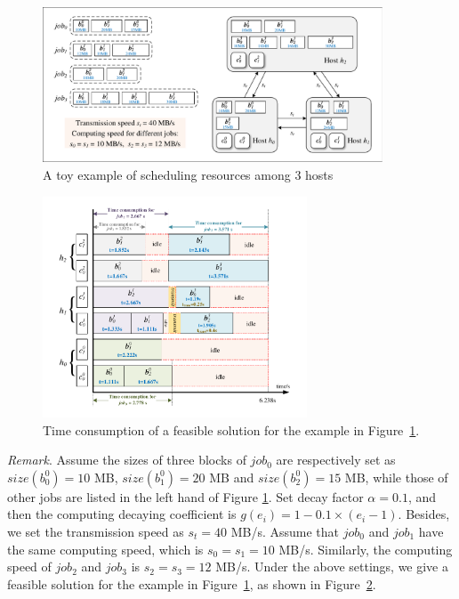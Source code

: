 \documentclass{llncs}
\begin{document}
\begin{figure}[H]
\begin{center}
\includegraphics[width=0.9\textwidth]{Fig-MultiHostExample.pdf}
\caption{A toy example of scheduling resources among 3 hosts}\label{Fig-MultiHostExample}
\end{center}
\end{figure}



\begin{figure}[htbp]
\begin{center}
\includegraphics[width=0.7\textwidth]{Fig-MultiHostResult.pdf}
\caption{Time consumption of a feasible solution for the example in Figure~\ref{Fig-MultiHostExample}.}
\label{Fig-MultiHostResult}
\end{center}
\end{figure}

\emph{Remark}. Assume the sizes of three blocks of $job_0$ are respectively set as $size(b_0^0)=10$ MB,
$size(b^0_1) = 20$ MB and $size(b^0_2) = 15$ MB, while those of other jobs are listed in the left hand of Figure \ref{Fig-MultiHostExample}. Set decay factor $\alpha = 0.1$, and then the computing decaying coefficient is $g(e_i)=1-0.1\times(e_i-1)$. Besides, we set the transmission speed as $s_t = 40$ MB/s. Assume that $job_0$ and $job_1$ have the same computing speed, which is $s_0 = s_1= 10$ MB/s. Similarly, the computing speed of $job_2$ and $job_3$ is $s_2 = s_3= 12$ MB/s. Under the above settings, we give a feasible solution for the example in Figure~\ref{Fig-MultiHostExample}, as shown in Figure~\ref{Fig-MultiHostResult}.
\end{document}
